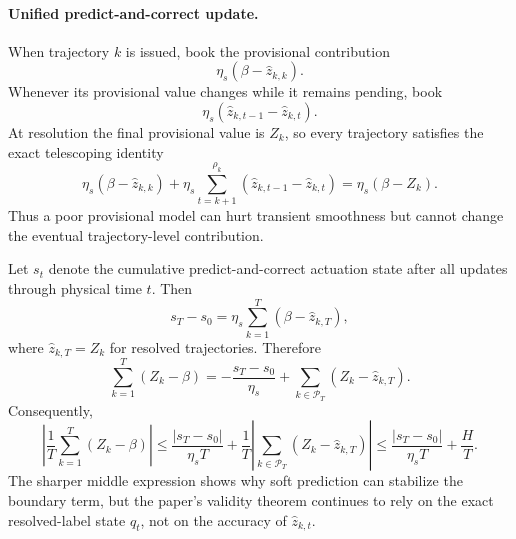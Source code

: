 \documentclass[11pt]{article}
\begin{document}
\paragraph{Unified predict-and-correct update.}
When trajectory $k$ is issued, book the provisional contribution
\begin{equation}
    \eta_s(\beta-\widehat z_{k,k}).
    \label{eq:predictive-issue-update}
\end{equation}
Whenever its provisional value changes while it remains pending, book
\begin{equation}
    \eta_s(\widehat z_{k,t-1}-\widehat z_{k,t}).
    \label{eq:predictive-incremental-correction}
\end{equation}
At resolution the final provisional value is $Z_k$, so every trajectory
satisfies the exact telescoping identity
\begin{equation}
\boxed{
    \eta_s(\beta-\widehat z_{k,k})
    +
    \eta_s\sum_{t=k+1}^{\rho_k}
    (\widehat z_{k,t-1}-\widehat z_{k,t})
    =
    \eta_s(\beta-Z_k).
}
\label{eq:predictive-telescope}
\end{equation}
Thus a poor provisional model can hurt transient smoothness but cannot change
the eventual trajectory-level contribution.

Let $s_t$ denote the cumulative predict-and-correct actuation state after all
updates through physical time $t$.  Then
\begin{equation}
    s_T-s_0
    =
    \eta_s\sum_{k=1}^{T}
    (\beta-\widehat z_{k,T}),
    \label{eq:predictive-state-identity}
\end{equation}
where $\widehat z_{k,T}=Z_k$ for resolved trajectories.  Therefore
\begin{equation}
\boxed{
    \sum_{k=1}^{T}(Z_k-\beta)
    =
    -\frac{s_T-s_0}{\eta_s}
    +
    \sum_{k\in\mathcal P_T}
    (Z_k-\widehat z_{k,T}).
}
\label{eq:predictive-accounting-identity}
\end{equation}
Consequently,
\begin{equation}
\boxed{
    \left|
        \frac1T\sum_{k=1}^{T}(Z_k-\beta)
    \right|
    \le
    \frac{|s_T-s_0|}{\eta_sT}
    +
    \frac1T
    \left|
        \sum_{k\in\mathcal P_T}(Z_k-\widehat z_{k,T})
    \right|
    \le
    \frac{|s_T-s_0|}{\eta_sT}
    +
    \frac HT.
}
\label{eq:predictive-accounting-bound}
\end{equation}
The sharper middle expression shows why soft prediction can stabilize the
boundary term, but the paper's validity theorem continues to rely on the exact
resolved-label state $q_t$, not on the accuracy of $\widehat z_{k,t}$.
\end{document}
